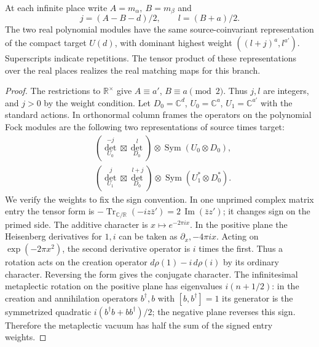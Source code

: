 \begin{proposition}[The real quotient for \(p=q=0\)]
At each infinite place\label{threal:compact} write \(A=m_\alpha,\ B=m_\beta\) and
\[
        j=(A-B-d)/2,\qquad l=(B+a)/2 .
\]
The two real polynomial modules have the same source-coinvariant
representation of the compact target \(U(d)\), with dominant highest
weight \(((l+j)^a,l^{a'})\). Superscripts indicate repetitions.
The tensor product of these representations over the real places
realizes the real matching maps for this branch.
\end{proposition}
\begin{proof}
The restrictions to \(\mathbb R^\times\) give \(A\equiv a'\),
\(B\equiv a\pmod2\). Thus \(j,l\) are integers, and \(j>0\) by the
weight condition. Let \(D_0=\mathbb C^d\), \(U_0=\mathbb C^a\),
\(U_1=\mathbb C^{a'}\) with the standard actions. In orthonormal
column frames the operators on the polynomial Fock modules are the
following two representations of source times target:
\[
\begin{split}
 &(\det_{U_0}^{-j}\boxtimes\det_{D_0}^{\,l})
               \otimes\operatorname{Sym}(U_0\otimes D_0),\\
 &(\det_{U_1}^{\,j}\boxtimes\det_{D_0}^{\,l+j})
               \otimes\operatorname{Sym}(U_1^*\otimes D_0^*).
\end{split}
\]
We verify the weights to fix the sign convention. In one unprimed
complex matrix entry the tensor form is
\(-\operatorname{Tr}_{\mathbb C/\mathbb R}(-i z\bar z')
=2\,\operatorname{Im}(\bar z z')\); it changes sign on the primed
side. The additive character is \(x\mapsto e^{-2\pi i x}\). In the
positive plane the Heisenberg derivatives for \(1,i\) can be taken
as \(\partial_x,-4\pi i x\). Acting on
\(\exp(-2\pi x^2)\), the second derivative operator is \(i\) times
the first. Thus a rotation acts on the creation operator
\(d\rho(1)-i\,d\rho(i)\) by its ordinary character. Reversing the
form gives the conjugate character. The infinitesimal metaplectic
rotation on the positive plane has eigenvalues \(i(n+1/2)\):
in the creation and annihilation operators \(b^\dagger,b\) with
\([b,b^\dagger]=1\) its generator is the symmetrized quadratic
\(i(b^\dagger b+bb^\dagger)/2\); the negative plane reverses this
sign. Therefore the metaplectic vacuum has half the sum of the signed
entry weights.


\end{proof}
